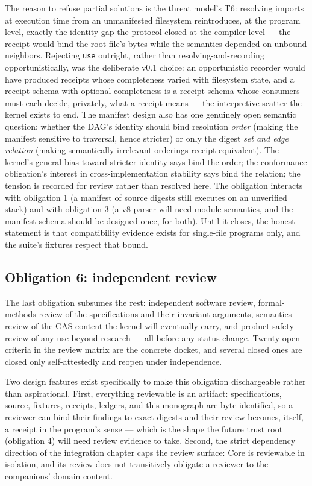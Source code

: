 The reason to refuse partial solutions is the threat model's T6: resolving imports at execution time from an unmanifested filesystem reintroduces, at the program level, exactly the identity gap the protocol closed at the compiler level --- the receipt would bind the root file's bytes while the semantics depended on unbound neighbors. Rejecting \texttt{use} outright, rather than resolving-and-recording opportunistically, was the deliberate v0.1 choice: an opportunistic recorder would have produced receipts whose completeness varied with filesystem state, and a receipt schema with optional completeness is a receipt schema whose consumers must each decide, privately, what a receipt means --- the interpretive scatter the kernel exists to end. The manifest design also has one genuinely open semantic question: whether the DAG's identity should bind resolution \emph{order} (making the manifest sensitive to traversal, hence stricter) or only the digest \emph{set and edge relation} (making semantically irrelevant orderings receipt-equivalent). The kernel's general bias toward stricter identity says bind the order; the conformance obligation's interest in cross-implementation stability says bind the relation; the tension is recorded for review rather than resolved here. The obligation interacts with obligation 1 (a manifest of source digests still executes on an unverified stack) and with obligation 3 (a v8 parser will need module semantics, and the manifest schema should be designed once, for both). Until it closes, the honest statement is that compatibility evidence exists for single-file programs only, and the suite's fixtures respect that bound.

\subsection{Obligation 6: independent review}\label{evid:ob:review}

The last obligation subsumes the rest: independent software review, formal-methods review of the specifications and their invariant arguments, semantics review of the CAS content the kernel will eventually carry, and product-safety review of any use beyond research --- all before any status change. Twenty open criteria in the review matrix are the concrete docket, and several closed ones are closed only self-attestedly and reopen under independence.

Two design features exist specifically to make this obligation dischargeable rather than aspirational. First, everything reviewable is an artifact: specifications, source, fixtures, receipts, ledgers, and this monograph are byte-identified, so a reviewer can bind their findings to exact digests and their review becomes, itself, a receipt in the program's sense --- which is the shape the future trust root (obligation 4) will need review evidence to take. Second, the strict dependency direction of the integration chapter caps the review surface: Core is reviewable in isolation, and its review does not transitively obligate a reviewer to the companions' domain content.

